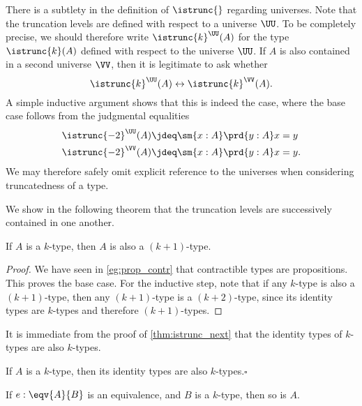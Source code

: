 \begin{rmk}
  There is a subtlety in the definition of $\istrunc{}$ regarding universes. Note that the truncation levels are defined with respect to a universe $\UU$. To be completely precise, we should therefore write $\istrunc{k}^{\UU}(A)$ for the type $\istrunc{k}(A)$ defined with respect to the universe $\UU$. If $A$ is also contained in a second universe $\VV$, then it is legitimate to ask whether
  \begin{equation*}
    \istrunc{k}^{\UU}(A)\leftrightarrow\istrunc{k}^{\VV}(A).
  \end{equation*}
  A simple inductive argument shows that this is indeed the case, where the base case follows from the judgmental equalities
  \begin{align*}
    \istrunc{-2}^{\UU}(A) & \jdeq \sm{x:A}\prd{y:A}x=y \\
    \istrunc{-2}^{\VV}(A) & \jdeq \sm{x:A}\prd{y:A}x=y.
  \end{align*}
  We may therefore safely omit explicit reference to the universes when considering truncatedness of a type.
\end{rmk}

We show in the following theorem that the truncation levels are successively contained in one another.

\begin{prp}\label{thm:istrunc_next}
If $A$ is a $k$-type, then $A$ is also a $(k+1)$-type.
\end{prp}

\begin{proof}
We have seen in \cref{eg:prop_contr} that contractible types are propositions. This proves the base case.
For the inductive step, note that if any $k$-type is also a $(k+1)$-type, then any $(k+1)$-type is a $(k+2)$-type, since its identity types are $k$-types and therefore $(k+1)$-types.
\end{proof}

It is immediate from the proof of \cref{thm:istrunc_next} that the identity types of $k$-types are also $k$-types.

\begin{cor}
  If $A$ is a $k$-type, then its identity types are also $k$-types.\hfill $\square$
\end{cor}

\begin{prp}\label{thm:ktype_eqv}
If $e:\eqv{A}{B}$ is an equivalence, and $B$ is a $k$-type, then so is $A$.
\end{prp}

